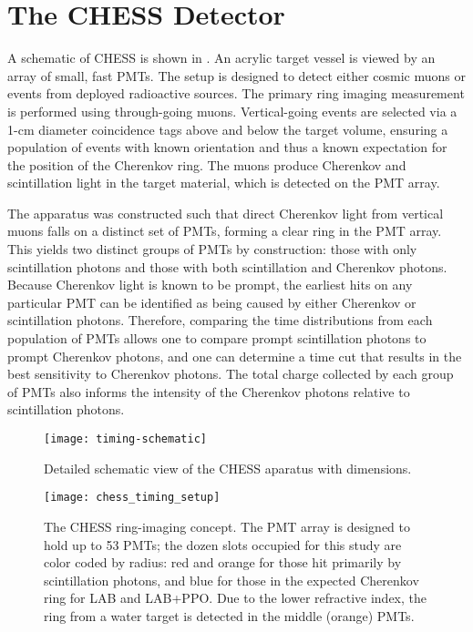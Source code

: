 \section{The CHESS Detector}\label{s:desc}

A schematic of CHESS is shown in .  
An acrylic target vessel is viewed by an array of small, fast PMTs. 
The setup is designed to detect either cosmic muons or events from deployed radioactive sources.  
The primary ring imaging measurement is performed using through-going muons.  
Vertical-going events are selected via a 1-cm diameter coincidence tags above and below the target volume, ensuring a population of events with known orientation and thus a known expectation for the position of the Cherenkov ring. 
The muons produce Cherenkov and scintillation light in the target material, which is detected on the PMT array. 

The apparatus was constructed such that direct Cherenkov light from vertical muons falls on a distinct set of PMTs, forming a clear ring in the PMT array.
This yields two distinct groups of PMTs by construction: those with only scintillation photons and those with both scintillation and Cherenkov photons. 
Because Cherenkov light is known to be prompt, the earliest hits on any particular PMT can be identified as being caused by either Cherenkov or scintillation photons.
Therefore, comparing the time distributions from each population of PMTs allows one to compare prompt scintillation photons to prompt Cherenkov photons, and one can determine a time cut that results in the best sensitivity to Cherenkov photons.
The total charge collected by each group of PMTs also informs the intensity of the Cherenkov photons relative to scintillation photons.

\begin{figure}
\centering
\texttt{[image: timing-schematic]}
\caption{Detailed schematic view of the CHESS aparatus with dimensions.}
\label{fig:timing-setup}
\end{figure}

\begin{figure}
\centering
\texttt{[image: chess\_timing\_setup]}
\caption{The CHESS ring-imaging concept. The PMT array is designed to hold up to 53 PMTs; the dozen slots occupied for this study are color coded by radius: red and orange for those hit primarily by scintillation photons, and blue for those in the expected Cherenkov ring for LAB and LAB+PPO. Due to the lower refractive index, the ring from a water target is detected in the middle (orange) PMTs. }
\label{fig:timing-setup-2}
\end{figure}

